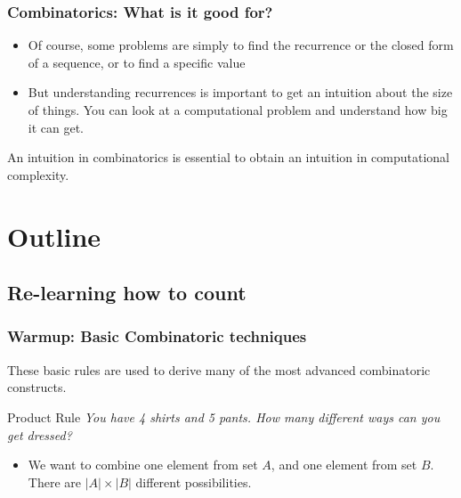 \documentclass{beamer}
\begin{document}
\begin{frame}
  \frametitle{Combinatorics: What is it good for?}
  \begin{itemize}
    \item Of course, some problems are simply to find the recurrence
      or the closed form of a sequence, or to find a specific value
    \item But understanding recurrences is important to get an
      \alert{intuition about the size of things}. You can look at
      a computational problem and understand how big it can get.
  \end{itemize}
  \bigskip
  \begin{exampleblock}{}
    An intuition in combinatorics is essential to obtain an intuition
    in computational complexity.
  \end{exampleblock}
\end{frame}

\section{Outline}
\subsection{Re-learning how to count}

\begin{frame}
  \frametitle{Warmup: Basic Combinatoric techniques}
  \begin{block}{}
    These basic rules are used to derive many of the most advanced
    combinatoric constructs.
  \end{block}
  \begin{block}{Product Rule}
    \emph{You have 4 shirts and 5 pants. How many different ways can
      you get dressed?}
  \end{block}
  \vfill
  {\small
  \begin{itemize}
  \item {} We want to combine one element from
    set $A$, and one element from set $B$. There are $|A|\times|B|$
    different possibilities.
  \end{itemize}
  }
\end{frame}
\end{document}
